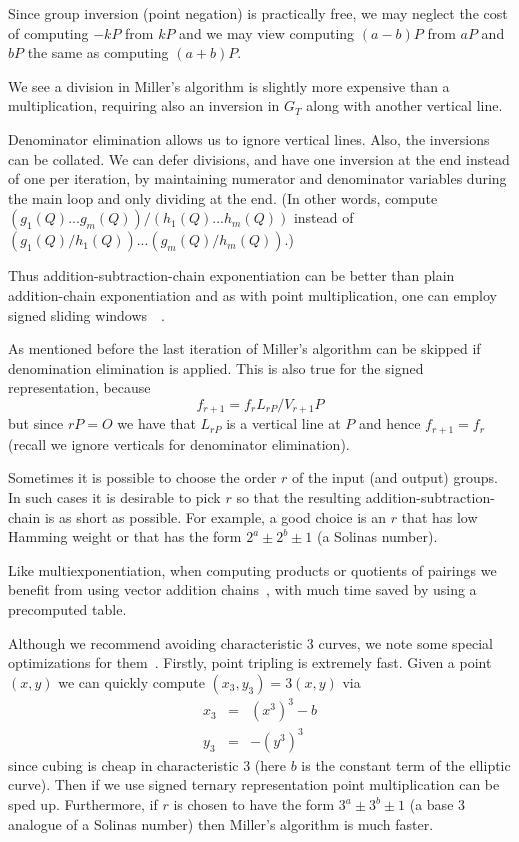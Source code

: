 Since group inversion (point negation) is practically free,
we may neglect the cost of computing $-kP$ from $kP$ and we may view
computing $(a-b)P$ from $aP$ and $bP$ the same as computing
$(a+b)P$.

We see a division in Miller's algorithm is slightly more expensive than
a multiplication, requiring also an inversion in $G_T$ along with
another vertical line.

Denominator elimination allows us to ignore vertical lines.
Also, the inversions can be collated. We can defer divisions,
and have one inversion at the end instead of one per iteration,
by maintaining numerator and denominator variables during the main loop
and only dividing at the end.
(In other words, compute $(g_1(Q) ... g_m(Q)) / (h_1(Q) ... h_m(Q))$
instead of $(g_1(Q) / h_1(Q)) ... (g_m(Q) / h_m(Q))$.)

Thus addition-subtraction-chain exponentiation can be
better than plain addition-chain exponentiation and as with
point multiplication, one can employ signed sliding
windows~\cite[Chapter 14]{handbook}~\cite[Section IV.2.5]{bss}.

As mentioned before the last iteration of Miller's algorithm can be skipped
if denomination elimination is applied.
This is also true for the signed representation, because
\[
f_{r+1} = f_r L_{rP} / V_{r+1}P
\]
but since $rP = O$
we have that $L_{rP}$ is a vertical line at $P$ and hence $f_{r+1} = f_r$
(recall we ignore verticals for denominator elimination).

Sometimes it is possible to choose the order $r$ of the input (and output)
groups. In such cases it is desirable to pick $r$ so that the resulting
addition-subtraction-chain is as short as possible. For example,
a good choice is an $r$ that has low Hamming weight or that has the form
$2^a \pm 2^b \pm 1$ (a Solinas number).

Like multiexponentiation,
when computing products or quotients of pairings we
benefit from using vector addition chains~\cite[Chapter 14]{handbook},
with much time saved by using a precomputed table.

Although we recommend avoiding characteristic 3 curves,
we note some special optimizations for them~\cite{bakls}.
Firstly, point tripling is extremely fast.
Given a point $(x,y)$ we can quickly
compute $(x_3,y_3) = 3(x,y)$ via
\[
\begin{array}{lcl}
x_3 &=& (x^3)^3 - b \\
y_3 &=& -(y^3)^3
\end{array}
\]
since cubing is cheap in characteristic 3
(here $b$ is the constant term of the elliptic curve).
Then if we use signed ternary representation point multiplication can be
sped up. Furthermore, if $r$ is chosen to have the form
$3^a \pm 3^b \pm 1$ (a base 3 analogue of a Solinas number) then Miller's
algorithm is much faster.

